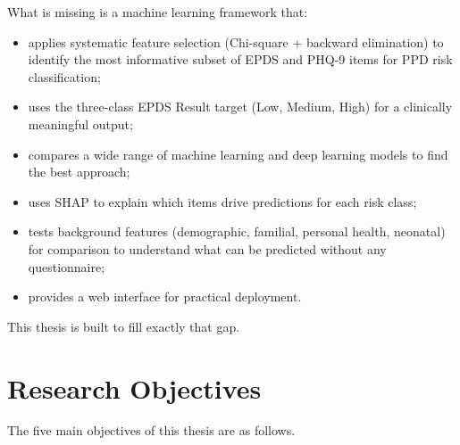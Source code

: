 What is missing is a machine learning framework that:
\begin{itemize}
    \item applies systematic feature selection (Chi-square + backward elimination) to identify the most informative subset of EPDS and PHQ-9 items for PPD risk classification;
    \item uses the three-class EPDS Result target (Low, Medium, High) for a clinically meaningful output;
    \item compares a wide range of machine learning and deep learning models to find the best approach;
    \item uses SHAP to explain which items drive predictions for each risk class;
    \item tests background features (demographic, familial, personal health, neonatal) for comparison to understand what can be predicted without any questionnaire;
    \item provides a web interface for practical deployment.
\end{itemize}

This thesis is built to fill exactly that gap.

\section{Research Objectives}

The five main objectives of this thesis are as follows.

